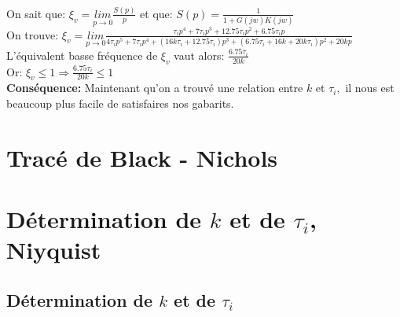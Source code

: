 \documentclass[12pt, a4paper, openany]{report}
\begin{document}
 \paragraph{}
 On sait que: \hspace{1mm} $\xi_{v}=\underset{p\longrightarrow 0}{lim}\frac{S(p)}{p}$ \hspace{1mm} et que: \hspace{1mm}$S(p)=\frac{1}{1+G(jw)K(jw)}$\\[0.75mm]
 On trouve: $\xi_{v}=\underset{p\longrightarrow 0}{lim} \frac{\tau_{i}p^{4} + 7 \tau_{i} p^{3} + 12.75 \tau_{i}p^{2} + 6.75 \tau_{i}p }{4 \tau_{i}p^{5} + 7 \tau_{i}p^{4} + ( 16 k \tau_{i} + 12.75 \tau_{i} )p^{3} + ( 6.75 \tau_{i} + 16 k + 20 k \tau_{i} )p^{2} + 20 k p}$\\[0.75mm]
 L'équivalent basse fréquence de $\xi_{v}$ vaut alors: \hspace{1mm}$\frac{6.75 \tau_{i}}{20k} $ \\[0.75mm]
 Or: \hspace{1mm} $\xi_{v} \leqslant 1 \Rightarrow \frac{6.75 \tau_{i}}{20k} \leqslant 1$\\[0.75mm]
 \textbf{Conséquence:}\hspace{1mm} Maintenant qu'on a trouvé une relation entre $k$ \hspace{1mm} et $\tau_{i},$ \hspace{1mm} il nous est beaucoup plus facile de satisfaires nos gabarits.  
 
 \section{Tracé de Black - Nichols} 

 \begin{center}
     \label{fig12}
 \end{center}

  
 \section{Détermination de $k$ et de $\tau_{i}$, Niyquist}
    
  \subsection{Détermination de $k$ et de $\tau_{i}$}  
  
\end{document}

